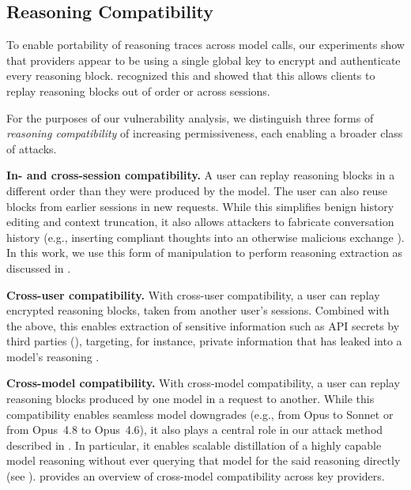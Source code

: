 \subsection{Reasoning Compatibility}
\label{sec:compatibility}

To enable portability of reasoning traces across model calls, our experiments show that providers appear to be using a single global key to encrypt and authenticate every reasoning block. \citet{green2026encryptedreasoning} recognized this and showed that this allows clients to replay reasoning blocks out of order or across sessions.

For the purposes of our vulnerability analysis, we distinguish three forms of \textit{reasoning compatibility} of increasing permissiveness, each enabling a broader class of attacks.


\textbf{In- and cross-session compatibility.} \; A user can replay reasoning blocks in a different order than they were produced by the model. The user can also reuse blocks from earlier sessions in new requests. While this simplifies benign history editing and context truncation, it also allows attackers to fabricate conversation history (e.g., inserting compliant thoughts into an otherwise malicious exchange \citep{khalil2026hiddenthought}). In this work, we use this form of manipulation to perform reasoning extraction as discussed in .

\textbf{Cross-user compatibility.} \; With cross-user compatibility, a user can replay encrypted reasoning blocks, taken from another user's sessions. Combined with the above, this enables extraction of sensitive information such as API secrets by third parties (), targeting, for instance, private information that has leaked into a model's reasoning \citep{green2025leakythoughtslargereasoning}.


\textbf{Cross-model compatibility.} \; With cross-model compatibility, a user can replay reasoning blocks produced by one model in a request to another. While this compatibility enables seamless model downgrades (e.g., from Opus to Sonnet or from Opus~4.8 to Opus~4.6), it also plays a central role in our attack method described in . In particular, it enables scalable distillation of a highly capable model reasoning without ever querying that model for the said reasoning directly (see ).  provides an overview of cross-model compatibility across key providers.


